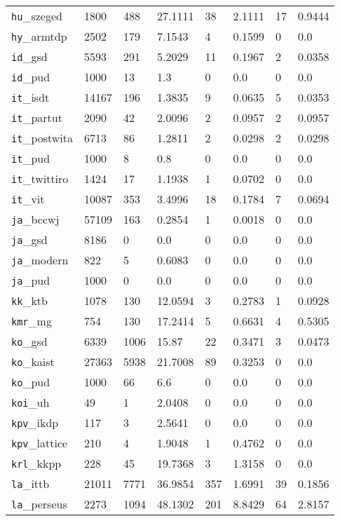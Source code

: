 \begin{longtable}{|l|l|l|l|l|l|l|l|}
\texttt{hu}\_szeged & 1800 & 488 & 27.1111 & 38 & 2.1111 & 17 & 0.9444\\
\texttt{hy}\_armtdp & 2502 & 179 & 7.1543 & 4 & 0.1599 & 0 & 0.0\\
\texttt{id}\_gsd & 5593 & 291 & 5.2029 & 11 & 0.1967 & 2 & 0.0358\\
\texttt{id}\_pud & 1000 & 13 & 1.3 & 0 & 0.0 & 0 & 0.0\\
\texttt{it}\_isdt & 14167 & 196 & 1.3835 & 9 & 0.0635 & 5 & 0.0353\\
\texttt{it}\_partut & 2090 & 42 & 2.0096 & 2 & 0.0957 & 2 & 0.0957\\
\texttt{it}\_postwita & 6713 & 86 & 1.2811 & 2 & 0.0298 & 2 & 0.0298\\
\texttt{it}\_pud & 1000 & 8 & 0.8 & 0 & 0.0 & 0 & 0.0\\
\texttt{it}\_twittiro & 1424 & 17 & 1.1938 & 1 & 0.0702 & 0 & 0.0\\
\texttt{it}\_vit & 10087 & 353 & 3.4996 & 18 & 0.1784 & 7 & 0.0694\\
\texttt{ja}\_bccwj & 57109 & 163 & 0.2854 & 1 & 0.0018 & 0 & 0.0\\
\texttt{ja}\_gsd & 8186 & 0 & 0.0 & 0 & 0.0 & 0 & 0.0\\
\texttt{ja}\_modern & 822 & 5 & 0.6083 & 0 & 0.0 & 0 & 0.0\\
\texttt{ja}\_pud & 1000 & 0 & 0.0 & 0 & 0.0 & 0 & 0.0\\
\texttt{kk}\_ktb & 1078 & 130 & 12.0594 & 3 & 0.2783 & 1 & 0.0928\\
\texttt{kmr}\_mg & 754 & 130 & 17.2414 & 5 & 0.6631 & 4 & 0.5305\\
\texttt{ko}\_gsd & 6339 & 1006 & 15.87 & 22 & 0.3471 & 3 & 0.0473\\
\texttt{ko}\_kaist & 27363 & 5938 & 21.7008 & 89 & 0.3253 & 0 & 0.0\\
\texttt{ko}\_pud & 1000 & 66 & 6.6 & 0 & 0.0 & 0 & 0.0\\
\texttt{koi}\_uh & 49 & 1 & 2.0408 & 0 & 0.0 & 0 & 0.0\\
\texttt{kpv}\_ikdp & 117 & 3 & 2.5641 & 0 & 0.0 & 0 & 0.0\\
\texttt{kpv}\_lattice & 210 & 4 & 1.9048 & 1 & 0.4762 & 0 & 0.0\\
\texttt{krl}\_kkpp & 228 & 45 & 19.7368 & 3 & 1.3158 & 0 & 0.0\\
\texttt{la}\_ittb & 21011 & 7771 & 36.9854 & 357 & 1.6991 & 39 & 0.1856\\
\texttt{la}\_perseus & 2273 & 1094 & 48.1302 & 201 & 8.8429 & 64 & 2.8157\\

\end{longtable}
